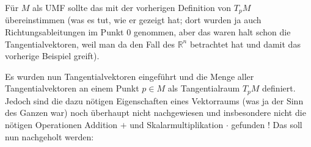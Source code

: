 \documentclass[../H_Analysis_main.tex]{subfiles}
\begin{document}
\begin{bsp}
Für $M$ als UMF sollte das mit der vorherigen Definition von $T_p M$ übereinstimmen (was es tut, wie er gezeigt hat; dort wurden ja auch Richtungsableitungen im Punkt 0 genommen, aber das waren halt schon die Tangentialvektoren, weil man da den Fall des $\mathbb{R}^n$ betrachtet hat und damit das vorherige Beispiel greift).
\end{bsp}


Es wurden nun Tangentialvektoren eingeführt und die Menge aller Tangentialvektoren an einem Punkt $p \in M$ als Tangentialraum $T_p M$ definiert. Jedoch sind die dazu nötigen Eigenschaften eines Vektorraums (was ja der Sinn des Ganzen war) noch überhaupt nicht nachgewiesen und insbesondere nicht die nötigen Operationen Addition $+$ und Skalarmultiplikation $\cdot$ gefunden ! Das soll nun nachgeholt werden:
\end{document}
